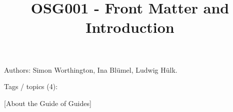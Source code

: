 \documentclass{article}
\begin{document}
\title{OSG001 - Front Matter and Introduction}

\maketitle


Authors: Simon Worthington, Ina Blümel, Ludwig Hülk.


Tags / topics (4): 


[About the Guide of Guides]
\end{document}
